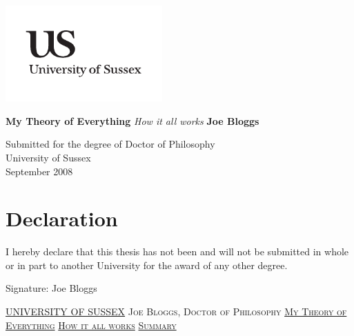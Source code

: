 \documentclass[a4paper,11pt]{report}
\newcommand{\linespacing}{1.5}
\renewcommand{\baselinestretch}{\linespacing}
\begin{document}




\thispagestyle{empty}
\begin{flushright}
\includegraphics[width=6cm]{uslogo}
\end{flushright}	
\vskip40mm
\begin{center}
\huge\textbf{My Theory of Everything}
\vskip2mm
\LARGE\textit{How it all works}
\vskip5mm
\Large\textbf{Joe Bloggs}
\normalsize
\end{center}
\vfill
\begin{flushleft}
\large
Submitted for the degree of Doctor of Philosophy \\
University of Sussex	\\
September 2008
\end{flushleft}		


\chapter*{Declaration}
I hereby declare that this thesis has not been and will not be submitted in whole or in part to another University for the award of any other degree.
	

\vskip5mm
Signature:
\vskip20mm
Joe Bloggs


\thispagestyle{empty}
\newpage
\null\vskip10mm
\begin{center}
\large
\underline{UNIVERSITY OF SUSSEX}
\vskip20mm
\textsc{Joe Bloggs, Doctor of Philosophy}
\vskip20mm
\underline{\textsc{My Theory of Everything}}
\vskip0mm
\underline{\textsc{How it all works}}
\vskip20mm
\underline{\textsc{Summary}}
\vskip2mm
\end{center}
\renewcommand{\baselinestretch}{1.0}
\small\normalsize
\end{document}
